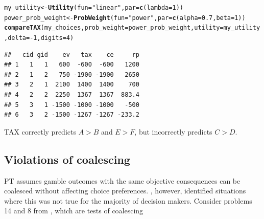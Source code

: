 \documentclass{article}\usepackage[]{graphicx}\usepackage[]{color}
\makeatletter
\newcommand{\hlnum}[1]{\textcolor[rgb]{0.686,0.059,0.569}{#1}}%
\newcommand{\hlstr}[1]{\textcolor[rgb]{0.192,0.494,0.8}{#1}}%
\newcommand{\hlopt}[1]{\textcolor[rgb]{0,0,0}{#1}}%
\newcommand{\hlstd}[1]{\textcolor[rgb]{0.345,0.345,0.345}{#1}}%
\newcommand{\hlkwb}[1]{\textcolor[rgb]{0.69,0.353,0.396}{#1}}%
\newcommand{\hlkwc}[1]{\textcolor[rgb]{0.333,0.667,0.333}{#1}}%
\newcommand{\hlkwd}[1]{\textcolor[rgb]{0.737,0.353,0.396}{\textbf{#1}}}%
\newenvironment{kframe}{%
 \def\at@end@of@kframe{}%
 \ifinner\ifhmode%
  \def\at@end@of@kframe{\end{minipage}}%
  \begin{minipage}{\columnwidth}%
 \fi\fi%
 \def\FrameCommand##1{\hskip\@totalleftmargin \hskip-\fboxsep
 \colorbox{shadecolor}{##1}\hskip-\fboxsep
     \hskip-\linewidth \hskip-\@totalleftmargin \hskip\columnwidth}%
 \MakeFramed {\advance\hsize-\width
   \@totalleftmargin\z@ \linewidth\hsize
   \@setminipage}}%
 {\par\unskip\endMakeFramed%
 \at@end@of@kframe}
\newenvironment{knitrout}{}{} %
\makeatother
\begin{document}
\begin{knitrout}
\color{fgcolor}\begin{kframe}
\begin{alltt}
\hlstd{my_utility} \hlkwb{<-} \hlkwd{Utility}\hlstd{(}\hlkwc{fun}\hlstd{=}\hlstr{"linear"}\hlstd{,} \hlkwc{par}\hlstd{=}\hlkwd{c}\hlstd{(}\hlkwc{lambda}\hlstd{=}\hlnum{1}\hlstd{))}
\hlstd{power_prob_weight} \hlkwb{<-} \hlkwd{ProbWeight}\hlstd{(}\hlkwc{fun}\hlstd{=}\hlstr{"power"}\hlstd{,} \hlkwc{par}\hlstd{=}\hlkwd{c}\hlstd{(}\hlkwc{alpha}\hlstd{=}\hlnum{0.7}\hlstd{,} \hlkwc{beta}\hlstd{=}\hlnum{1}\hlstd{))}
\hlkwd{compareTAX}\hlstd{(my_choices,} \hlkwc{prob_weight}\hlstd{=power_prob_weight,} \hlkwc{utility}\hlstd{=my_utility,} \hlkwc{delta}\hlstd{=}\hlopt{-}\hlnum{1}\hlstd{,} \hlkwc{digits}\hlstd{=}\hlnum{4}\hlstd{)}
\end{alltt}
\begin{verbatim}
##   cid gid    ev   tax    ce     rp
## 1   1   1   600  -600  -600   1200
## 2   1   2   750 -1900 -1900   2650
## 3   2   1  2100  1400  1400    700
## 4   2   2  2250  1367  1367  883.4
## 5   3   1 -1500 -1000 -1000   -500
## 6   3   2 -1500 -1267 -1267 -233.2
\end{verbatim}
\end{kframe}
\end{knitrout}


TAX correctly predicts $A > B$ and $E > F$, but incorrectly predicts $C > D$.

\subsection{Violations of coalescing}

PT assumes gamble outcomes with the same objective consequences can be coalesced without affecting choice preferences. \cite{Birnbaum_2004}, however, identified situations
where this was not true for the majority of decision makers. Consider problems 14 and 8 from \citet[][Table 3 p. 95]{Birnbaum_2004}, which are tests of coalescing
\end{document}
